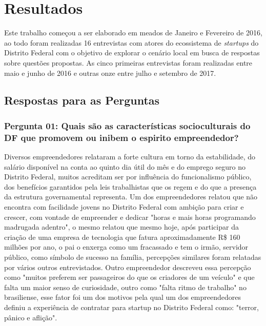 \chapter[Resultados]{Resultados}
\label{cap-resultados}

Este trabalho começou a ser elaborado em meados de Janeiro e Fevereiro de 2016, ao todo foram realizadas 16 entrevistas com atores do ecossistema de \textit{startups} do Distrito Federal com o objetivo de explorar o cenário local em busca de respostas sobre questões propostas. As cinco primeiras entrevistas foram realizadas entre maio e junho de 2016 e outras onze entre julho e setembro de 2017.

\section{Respostas para as Perguntas}
\label{section:perguntas_de_pesquisa}

\subsection*{Pergunta 01: Quais são as características socioculturais do DF que promovem ou inibem o espirito empreendedor?}
\label{subsection:pergunta_de_pesquisa_1}

Diversos empreendedores relataram a forte cultura em torno da estabilidade, do salário disponível na conta ao quinto dia útil do mês e do emprego seguro no Distrito Federal, muitos acreditam ser por influência do funcionalismo público, dos benefícios garantidos pela leis trabalhistas que os regem e do que a presença da estrutura governamental representa. Um dos empreendedores relatou que não encontra com facilidade jovens no Distrito Federal com ambição para criar e crescer, com vontade de empreender e dedicar "horas e mais horas programando madrugada adentro", o mesmo relatou que mesmo hoje, após participar da criação de uma empresa de tecnologia que fatura aproximadamente R\$ 160 milhões por ano, o pai o enxerga como um fracassado e tem o irmão, servidor público, como símbolo de sucesso na família, percepções similares foram relatadas por vários outros entrevistados. Outro empreendedor descreveu essa percepção como "muitos preferem ser passageiros do que os criadores de um veículo" e que falta um maior senso de curiosidade, outro como "falta ritmo de trabalho" no brasiliense, esse fator foi um dos motivos pela qual um dos empreendedores definiu a experiência de contratar para startup no Distrito Federal como: "terror, pânico e aflição". 

